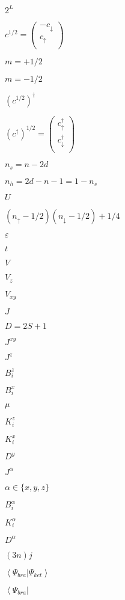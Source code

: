 \documentclass{article}
\begin{document}
$2^L$
\pagebreak

$c^{1/2} = \left( \begin{array}{c} -c_{\downarrow} \\ c_{\uparrow} \\ \end{array} \right)$
\pagebreak

$ m=+1/2$
\pagebreak

$ m=-1/2$
\pagebreak

$ \left(c^{1/2}\right)^\dagger$
\pagebreak

$\left(c^{\dagger}\right)^{1/2} = \left( \begin{array}{c} c^\dagger_{\uparrow} \\ c^\dagger_{\downarrow} \\ \end{array} \right)$
\pagebreak

$n_s=n-2d$
\pagebreak

$n_h=2d-n-1=1-n_s$
\pagebreak

$U$
\pagebreak

$(n_{\uparrow}-1/2)(n_{\downarrow}-1/2)+1/4$
\pagebreak

$\varepsilon$
\pagebreak

$t$
\pagebreak

$V$
\pagebreak

$V_z$
\pagebreak

$V_{xy}$
\pagebreak

$J$
\pagebreak

$D=2S+1$
\pagebreak

$J^{xy}$
\pagebreak

$J^{z}$
\pagebreak

$B^{z}_i$
\pagebreak

$B^{x}_i$
\pagebreak

$\mu$
\pagebreak

$K^{z}_i$
\pagebreak

$K^{x}_i$
\pagebreak

$D^{y}$
\pagebreak

$J^{\alpha}$
\pagebreak

$\alpha \in \{x,y,z\} $
\pagebreak

$B^{\alpha}_i$
\pagebreak

$K^{\alpha}_i$
\pagebreak

$D^{\alpha}$
\pagebreak

$(3n)j$
\pagebreak

$\left<\Psi_{bra}|\Psi_{ket}\right>$
\pagebreak

$\left<\Psi_{bra}\right|$
\pagebreak
\end{document}
